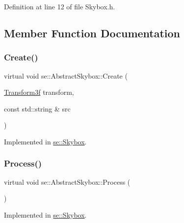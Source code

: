 Definition at line 12 of file Skybox.\+h.



\subsection{Member Function Documentation}
\mbox{\label{classse_1_1_abstract_skybox_ad9c98023e2ae2cfbb6c84929a1b9f46b}} 
\subsubsection{\texorpdfstring{Create()}{Create()}}
{\footnotesize\ttfamily virtual void se\+::\+Abstract\+Skybox\+::\+Create (\begin{DoxyParamCaption}\item[{\mbox{\hyperlink{classse_1_1_transform3f}{Transform3f}}}]{transform,  }\item[{const std\+::string \&}]{src }\end{DoxyParamCaption})\hspace{0.3cm}{\ttfamily [pure virtual]}}



Implemented in \mbox{\hyperlink{classse_1_1_skybox_a224bf849fd73b70f59613ebd572fd2ff}{se\+::\+Skybox}}.

\mbox{\label{classse_1_1_abstract_skybox_a652add712c92f3d7ebe7f82dc353fa1c}} 
\subsubsection{\texorpdfstring{Process()}{Process()}}
{\footnotesize\ttfamily virtual void se\+::\+Abstract\+Skybox\+::\+Process (\begin{DoxyParamCaption}{ }\end{DoxyParamCaption})\hspace{0.3cm}{\ttfamily [pure virtual]}}



Implemented in \mbox{\hyperlink{classse_1_1_skybox_acd2b0707c02b2a9ac48bcdd79608801c}{se\+::\+Skybox}}.

\mbox{\label{classse_1_1_abstract_skybox_a5aa158b7db1140ffc5c696347f32e2ef}} 
